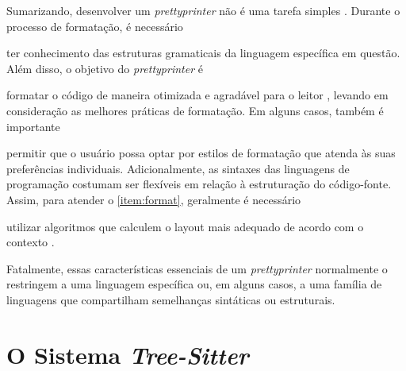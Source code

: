 \documentclass
  [11pt,a4paper,english,brazil,openright,sumario=tradicional,twoside]
  {abntex2}
\newcommand{\treesitter}{\textit{Tree-Sitter}\xspace}
\begin{document}
  Sumarizando, desenvolver um \textit{prettyprinter} não é uma tarefa simples
  \cite[55]{hughes-1995-design}. Durante o processo de formatação, é necessário
  \begin{inparaenum}
    \item ter conhecimento das estruturas gramaticais da linguagem específica
          em questão. Além disso, o objetivo do \textit{prettyprinter} é
    \item \label{item:format} formatar o código de maneira otimizada e
          agradável para o leitor \cite[55]{hughes-1995-design}, levando em
          consideração as melhores práticas de formatação. Em alguns casos,
          também é importante
    \item permitir que o usuário possa optar por estilos de formatação que
          atenda às suas preferências individuais. Adicionalmente, as sintaxes
          das linguagens de programação costumam ser flexíveis em relação à
          estruturação do código-fonte. Assim, para atender o
          \cref{item:format}, geralmente é necessário
    \item utilizar algoritmos que calculem o layout mais adequado de acordo com
          o contexto
          \cites
            [12]{jasper-2023-clang}
            {goldstein-1973-pretty}
            {hughes-1995-design}
            {yelland-2015-new}.
  \end{inparaenum}
  Fatalmente, essas características essenciais de um \textit{prettyprinter}
  normalmente o restringem a uma linguagem específica ou, em alguns casos, a
  uma família de linguagens que compartilham semelhanças sintáticas ou
  estruturais.


  \chapter{O Sistema \treesitter}
  \label{chapter:tree-sitter}
\end{document}
